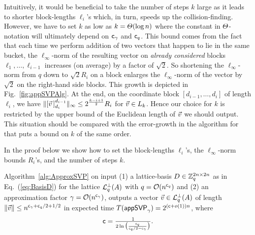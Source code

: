 Intuitively, it would be beneficial to take the number of steps $k$ large as it leads to shorter block-lengths $\ell_i$'s which, in turn, speeds up the collision-finding. However, we have to set $k$ as low as $k = \varTheta(\log n)$ where the constant in $\varTheta$-notation will ultimately depend on $\mathsf{c}_{\gamma}$ and $\mathsf{c}_q$. This bound comes from the fact that each time we perform addition of two vectors that happen to lie in the same bucket, the $\ell_{\infty}$-norm of the resulting vector on \emph{already considered} blocks $\ell_1, \ldots, \ell_{i-1}$ increases (on average) by a factor of $\sqrt{2}$. So shortening the $\ell_{\infty}$-norm from $q$ down to $\sqrt{2}R_i$ on a block enlarges the $\ell_{\infty}$-norm of the vector by $\sqrt{2}$ on the right-hand side blocks. This growth is depicted in Fig.~\ref{fig:appSVPAlg}. At the end, on the coordinate block $[d_{i-1}, \ldots, d_{i}]$ of length $\ell_i$, we have $\| [\vvec\mkern3mu]_{d_i}^{d_{i-1}} \|_{\infty} \leq 2^{\frac{k-i+1}{2}} R_i $ for $\vvec \in L_k$. Hence our choice for $k$ is restricted by the upper bound of the Euclidean length of $\vvec$ we should output. This situation should be compared with the error-growth in the \BKW algorithm for \LWE that puts a bound on $k$ of the same order.


In the proof below we show how to set the block-lengths $\ell_i$'s, the $\ell_\infty$-norm bounds $R_i$'s, and the number of steps $k$.
\begin{thm} \label{thm:appSVP}
	Algorithm~\ref{alg:ApproxSVP} on input (1) a lattice-basis $D \in {{\mathbb Z}}_q^{2n \times 2n}$ as in Eq.~(\ref{eq:BasisD}) for the lattice $\mathcal{L}_q^{\perp}(A)$ with $q = \mathcal{O}(n^{\mathsf{c}_q})$ and (2) an approximation factor $\gamma = \mathcal{O}(n^{\mathsf{c}_{\gamma}})$, outputs a vector $\vvec \in \qLATTp(A)$ of length $\|\vvec \| \leq n^{\cg+\cq/2 + 1/2}$ in expected time $T(\textsf{appSVP}_{\gamma})=2^{(\mathsf{c}+o(1)) n}$, where
	\begin{equation} \label{eq:AppSVPRT}
		\mathsf{c} = \tfrac{1}{2 \ln \big( \frac{\mathsf{c}_q}{\mathsf{c}_q/2-\mathsf{c}_{\gamma}} \big)}.
	\end{equation}
\end{thm}

